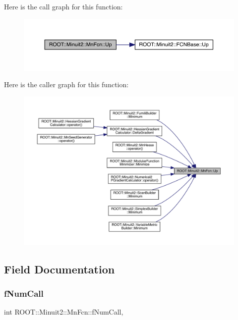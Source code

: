 Here is the call graph for this function\+:
\nopagebreak
\begin{figure}[H]
\begin{center}
\leavevmode
\includegraphics[width=350pt]{de/d0e/classROOT_1_1Minuit2_1_1MnFcn_a2c91d0dd77e9c913116fb84b6fe31633_cgraph}
\end{center}
\end{figure}
Here is the caller graph for this function\+:
\nopagebreak
\begin{figure}[H]
\begin{center}
\leavevmode
\includegraphics[width=350pt]{de/d0e/classROOT_1_1Minuit2_1_1MnFcn_a2c91d0dd77e9c913116fb84b6fe31633_icgraph}
\end{center}
\end{figure}


\subsection{Field Documentation}
\mbox{\label{classROOT_1_1Minuit2_1_1MnFcn_a5a9224bf6024caf935f26488ed112e10}} 
\subsubsection{\texorpdfstring{fNumCall}{fNumCall}}
{\footnotesize\ttfamily int R\+O\+O\+T\+::\+Minuit2\+::\+Mn\+Fcn\+::f\+Num\+Call\hspace{0.3cm}{\ttfamily [mutable]}, {\ttfamily [protected]}}



